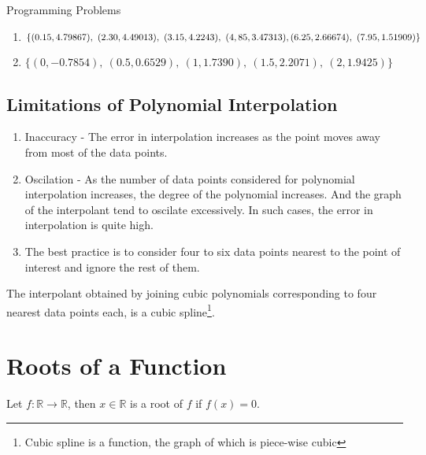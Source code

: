 \begin{remark}Programming Problems
	\begin{enumerate}
		\item $\{(0.15,4.79867),\ (2.30,4.49013),\ (3.15,4.2243),\ (4,85,3.47313),\\ (6.25,2.66674),\ (7.95,1.51909)\}$ \cite[Example 3.4]{kiusalaas}
		\item $\{(0,-0.7854),\ (0.5,0.6529),\ (1,1.7390),\ (1.5,2.2071),\ (2,1.9425)\}$\\ \cite[Problem Set 3.1.5]{kiusalaas}
	\end{enumerate}
\end{remark}

\subsection{Limitations of Polynomial Interpolation}
\begin{enumerate}
	\item Inaccuracy - The error in interpolation increases as the point moves away from most of the data points.
	\item Oscilation - As the number of data points considered for polynomial interpolation increases, the degree of the polynomial increases.
		And the graph of the interpolant tend to oscilate excessively.
		In such cases, the error in interpolation is quite high. 
	\item The best practice is to consider four to six data points nearest to the point of interest and ignore the rest of them.
\end{enumerate}

\begin{remark}
	The interpolant obtained by joining cubic polynomials corresponding to four nearest data points each, is a cubic spline\footnote{Cubic spline is a function, the graph of which is piece-wise cubic}.
\end{remark}

\section{Roots of a Function}
\begin{definition}
	Let $f : \mathbb{R} \to \mathbb{R}$, then $x \in \mathbb{R}$ is a root of $f$ if $f(x) = 0$.
\end{definition}


